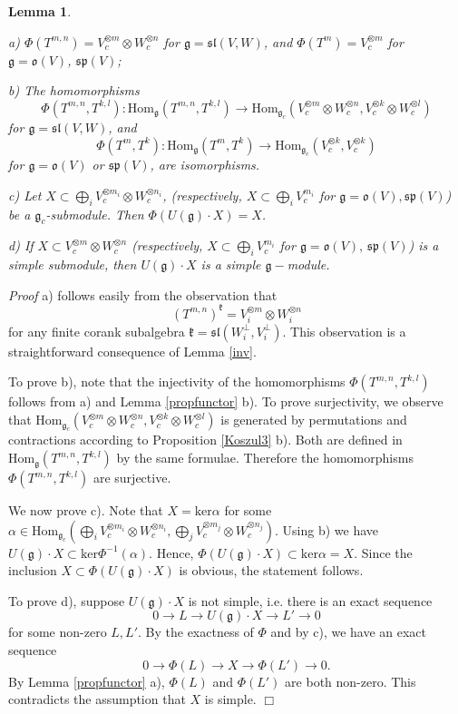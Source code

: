 \documentclass[10pt]{amsart}
\newcounter{theorem}
\newtheorem{lemma}[theo]{Lemma}
\renewenvironment{proof}{ \emph{Proof}}{$\Box$}
\renewcommand{\sp}{\mathfrak{sp}}
\renewcommand{\sl}{\mathfrak{sl}}
\newcommand{\kk}{\mathfrak{k}}
\newcommand{\oo}{\mathfrak{o}}
\renewcommand{\gg}{\mathfrak{g}}
\newcommand{\Ker}{\mathrm{ker}}
\newcommand{\Hom}{\mathrm{Hom}}
\begin{document}
\begin{lemma}\label{tensorfunctor} 

a) $\Phi(T^{m,n})=V_c^{\otimes m}\otimes W_c^{\otimes n}$ for $\gg =
\sl(V,W)$, and 
$\Phi(T^m)=V_c^{\otimes m}$ for $\gg=\oo(V)$, $\sp(V)$;

b) The homomorphisms 
$$\Phi(T^{m,n},T^{k,l}):\Hom_\gg(T^{m,n},T^{k,l})\to \Hom_{\gg_c}(V_c^{\otimes m}\otimes W_c^{\otimes n},V_c^{\otimes k}\otimes W_c^{\otimes l})$$ 
for $\gg=\sl(V,W)$, and
$$\Phi(T^m,T^k):\Hom_\gg(T^m,T^k)\to \Hom_{\gg_c}(V_c^{\otimes k},V_c^{\otimes k})$$
for  $\gg=\oo(V)$ or $\sp(V)$, are isomorphisms.

c) Let $X\subset \bigoplus_i V_c^{\otimes m_i}\otimes W_c^{\otimes  n_i}$, 
(respectively, $X \subset \bigoplus_i V_c^{m_i}$ for $\gg = \oo(V),\sp(V)$) be a $\gg_c$-submodule. Then $\Phi(U(\gg)\cdot X)=X$.

d) If  $X\subset V_c^{\otimes m}\otimes W_c^{\otimes n}$ (respectively, $X \subset \bigoplus_i V_c^{m_i}$ for $\gg = \oo(V),\,\sp(V)$) is a simple submodule, then $U(\gg)\cdot X$ is a simple $\gg-$module.
\end{lemma}
\begin{proof} a) follows easily from the observation that
$$(T^{m,n})^{\kk}=V_i^{\otimes m}\otimes W_i^{\otimes n}$$ for any finite corank subalgebra $\kk=\sl(W_i^\perp,V_i^\perp)$. This observation is a straightforward consequence of Lemma \ref{inv}.

To prove b), note that the injectivity of the homomorphisms $\Phi(T^{m,n},T^{k,l})$ follows from a) and Lemma \ref{propfunctor} b). To prove surjectivity, we observe that
$\Hom_{\gg_c}(V_c^{\otimes m}\otimes W_c^{\otimes n},V_c^{\otimes k}\otimes W_c^{\otimes l})$ is generated by permutations and contractions according to Proposition \ref{Koszul3} b). Both are defined in $\Hom_\gg(T^{m,n},T^{k,l})$ by the same formulae. Therefore the homomorphisms $\Phi(T^{m,n}, T^{k,l})$ are surjective.  

We now prove c). Note that $X=\Ker \alpha$ for some 
$\alpha\in\Hom_{\gg_c}( \bigoplus_i V_c^{\otimes m_i}\otimes W_c^{\otimes n_i}, \bigoplus_j V_c^{\otimes m_j}\otimes W_c^{\otimes n_j})$.
Using b) we have $U(\gg)\cdot X\subset\Ker \Phi^{-1}(\alpha)$. Hence, $\Phi(U(\gg)\cdot X)\subset\Ker\alpha=X$. Since the inclusion $X\subset\Phi(U(\gg)\cdot X)$ is obvious,
the statement follows.

To prove d), suppose $U(\gg)\cdot X$ is not simple, i.e. there is an exact sequence
$$0\to L\to U(\gg)\cdot X\to L'\to 0$$
for some non-zero $L,L'$. By the exactness of $\Phi$ and by c), we have an exact sequence
$$0\to \Phi(L)\to X\to \Phi(L')\to 0.$$
By Lemma \ref{propfunctor} a), $\Phi(L)$ and $\Phi(L')$ are both non-zero. This contradicts the assumption that $X$ is simple.
\end{proof}
\end{document}
